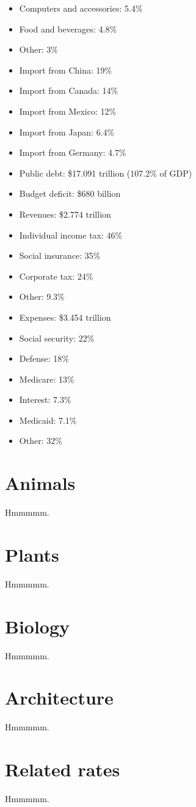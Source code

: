 \documentclass{article}
\begin{document}
\begin{itemize}
	\item Computers and accessories: 5.4\%
	\item Food and beverages: 4.8\%
	\item Other: 3\%
	\item Import from China: 19\%
	\item Import from Canada: 14\%
	\item Import from Mexico: 12\%
	\item Import from Japan: 6.4\%
	\item Import from Germany: 4.7\%
	\item Public debt: \$17.091 trillion (107.2\% of GDP)
	\item Budget deficit: \$680 billion
	\item Revenues: \$2.774 trillion
	\item Individual income tax: 46\%
	\item Social insurance: 35\%
	\item Corporate tax: 24\%
	\item Other: 9.3\%
	\item Expenses: \$3.454 trillion
	\item Social security: 22\%
	\item Defense: 18\%
	\item Medicare: 13\%
	\item Interest: 7.3\%
	\item Medicaid: 7.1\%
	\item Other: 32\%
\end{itemize}

\section{Animals}
Hmmmmm.

\section{Plants}
Hmmmmm.

\section{Biology}
Hmmmmm.

\section{Architecture}
Hmmmmm.

\section{Related rates}
Hmmmmm.
\end{document}

